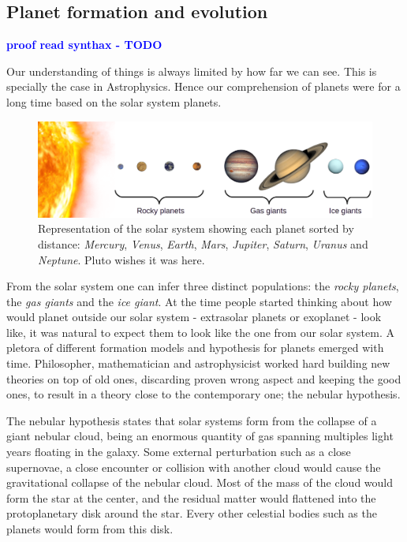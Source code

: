 \documentclass[a4paper, 11pt]{article}
\newcommand{\todonote}[3] {
	\textbf{\textcolor{#2}{#3 - #1}}
}
\newcommand{\todo}[1] {\todonote{TODO}{blue}{#1}}
\begin{document}
   
    \subsection{Planet formation and evolution}
    
    \todo{proof read synthax}
    Our understanding of things is always limited by how far we can see. This is specially the case in Astrophysics. Hence our comprehension of planets were for a long time based on the solar system planets.
    
    \begin{figure}[H]                                           
    	\centering \includegraphics[width=1\textwidth]{images/solar_system_cropped.png}
    	\caption{Representation of the solar system showing each planet sorted by distance: \textit{Mercury}, \textit{Venus}, \textit{Earth}, \textit{Mars}, \textit{Jupiter}, \textit{Saturn}, \textit{Uranus} and \textit{Neptune}. Pluto wishes it was here.}
    	\label{fig:solar_system}
    \end{figure}
    
    From the solar system one can infer three distinct populations: the \textit{rocky planets}, the \textit{gas giants} and the \textit{ice giant}. At the time people started thinking about how would planet outside our solar system - extrasolar planets or exoplanet - look like, it was natural to expect them to look like the one from our solar system.  A pletora of different formation models and hypothesis for planets emerged with time. Philosopher, mathematician and astrophysicist worked hard building new theories on top of old ones, discarding proven wrong aspect and keeping the good ones, to result in a theory close to the contemporary one; the nebular hypothesis. 
    
    The nebular hypothesis states that solar systems form from the collapse of a giant nebular cloud, being an enormous quantity of gas spanning multiples light years floating in the galaxy. Some external perturbation such as a close supernovae, a close encounter or collision with another cloud would cause the gravitational collapse of the nebular cloud. Most of the mass of the cloud would form the star at the center, and the residual matter would flattened into the protoplanetary disk around the star. Every other celestial bodies such as the planets would form from this disk. 
    
\end{document}
